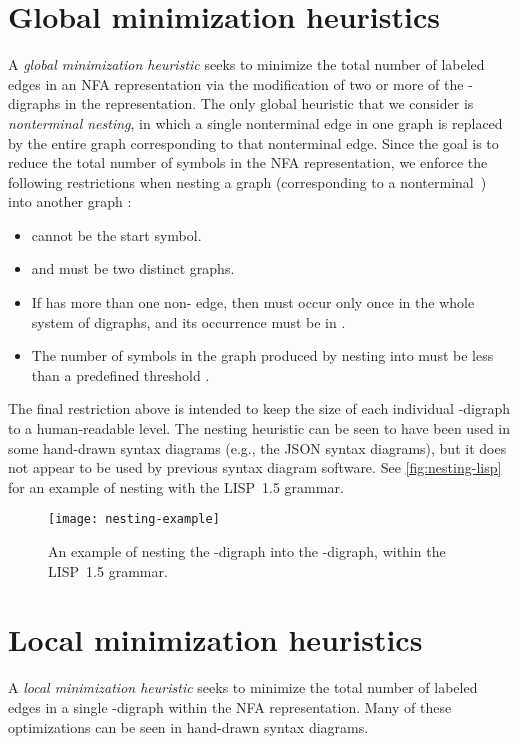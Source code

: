 \documentclass[10pt]{llncs}
\begin{document}
\section{Global minimization heuristics}
A \emph{global minimization heuristic} seeks to minimize the total number of labeled edges in an NFA representation via the modification of two or more of the -digraphs in the representation. The only global heuristic that we consider is \emph{nonterminal nesting}, in which a single nonterminal edge in one graph is replaced by the entire graph corresponding to that nonterminal edge. Since the goal is to reduce the total number of symbols in the NFA representation, we enforce the following restrictions when nesting a graph  (corresponding to a nonterminal~) into another graph :
\begin{itemize}
\item  cannot be the start symbol.
\item  and  must be two distinct graphs.
\item If  has more than one non- edge, then  must occur only once in the whole system of digraphs, and its occurrence must be in .
\item The number of symbols in the  graph produced by nesting  into  must be less than a predefined threshold .
\end{itemize}
The final restriction above is intended to keep the size of each individual -digraph to a human-readable level. The nesting heuristic can be seen to have been used in some hand-drawn syntax diagrams (e.g., the JSON syntax diagrams), but it does not appear to be used by previous syntax diagram software. See \autoref{fig:nesting-lisp} for an example of nesting with the LISP~1.5 grammar.

\begin{figure}
\centering
\texttt{[image: nesting-example]}
\caption{An example of nesting the  -digraph into the  -digraph, within the LISP~1.5 grammar.}
\label{fig:nesting-lisp}
\end{figure}

\section{Local minimization heuristics}
A \emph{local minimization heuristic} seeks to minimize the total number of labeled edges in a single -digraph within the NFA representation. Many of these optimizations can be seen in hand-drawn syntax diagrams.
\end{document}
